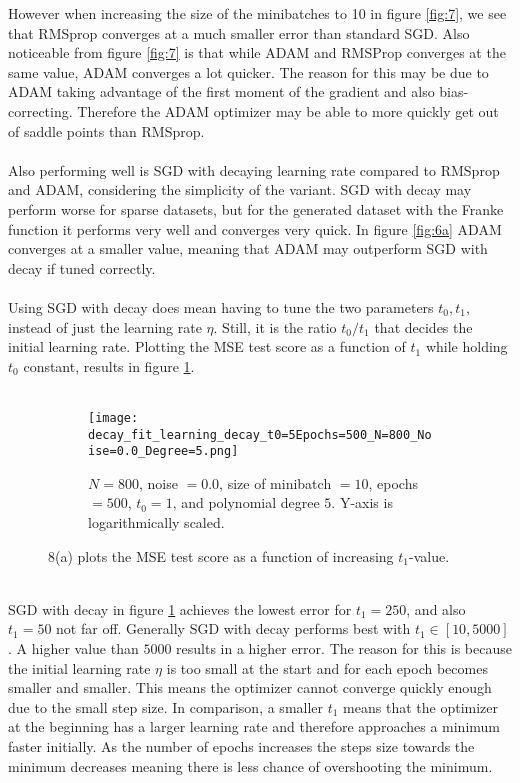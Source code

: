 \documentclass[a4paper,twocolumn]{article}
\begin{document}
However when increasing the size of the minibatches to 10 in figure \ref{fig:7}, we see that RMSprop converges at a much smaller error than standard SGD. Also noticeable from figure \ref{fig:7} is that while ADAM and RMSProp converges at the  same value, ADAM converges a lot quicker. The reason for this may be due to ADAM taking advantage of the first moment of the gradient and also bias-correcting. Therefore the ADAM optimizer may be able to more quickly get out of saddle points than RMSprop.\\
\\
Also performing well is SGD with decaying learning rate compared to RMSprop and ADAM, considering the simplicity of the variant. SGD with decay may perform worse for sparse datasets, but for the generated dataset with the Franke function it performs very well and converges very quick. In figure \ref{fig:6a} ADAM converges at a smaller value, meaning that ADAM may outperform SGD with decay if tuned correctly.\\
\\
Using SGD with decay does mean having to tune the two parameters $t_{0}, t_{1}$, instead of just the learning rate $\eta$. Still, it is the ratio $t_{0}/t_{1}$ that decides the initial learning rate. Plotting the MSE test score as a function of $t_{1}$ while holding $t_{0}$ constant, results in figure \ref{fig:8}.\\
\\
\begin{figure}[ht]
    \centering
    \begin{subfigure}[b]{0.9\columnwidth}
        \texttt{[image: decay\_fit\_learning\_decay\_t0=5Epochs=500\_N=800\_Noise=0.0\_Degree=5.png]}
        \caption{$N = 800$, noise $= 0.0$, size of minibatch $= 10$, epochs $= 500$, $t_{0} = 1$, and polynomial degree $5$. Y-axis is logarithmically scaled.}
    \end{subfigure}
    \caption{8(a) plots the MSE test score as a function of increasing $t_{1}$-value.}
    \label{fig:8}
\end{figure}\\
SGD with decay in figure \ref{fig:8} achieves the lowest error for $t_{1} = 250$, and also $t_{1} = 50$ not far off. Generally SGD with decay performs best with $t_{1} \in [10, 5000]$. A higher value than $5000$ results in a higher error. The reason for this is because the initial learning rate $\eta$ is too small at the start and for each epoch becomes smaller and smaller. This means the optimizer cannot converge quickly enough due to the small step size. In comparison, a smaller $t_{1}$ means that the optimizer at the beginning has a larger learning rate and therefore approaches a minimum faster initially. As the number of epochs increases the steps size towards the minimum decreases meaning there is less chance of overshooting the minimum.\\
\end{document}

